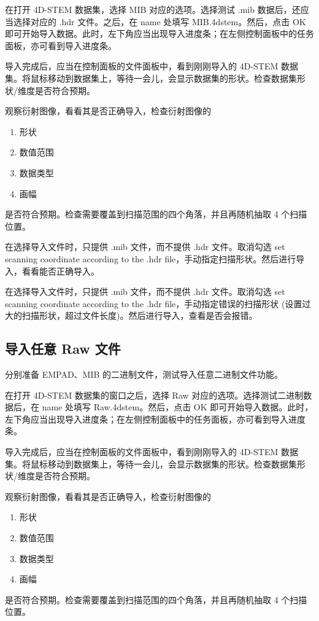 \documentclass[a4paper,12pt]{report}	%
\begin{document}
在打开 4D-STEM 数据集，选择 MIB 对应的选项。选择测试 .mib 数据后，还应当选择对应的 .hdr 文件。之后，在 name 处填写 MIB.4dstem。然后，点击 OK 即可开始导入数据。此时，左下角应当出现导入进度条；在左侧控制面板中的任务面板，亦可看到导入进度条。

导入完成后，应当在控制面板的文件面板中，看到刚刚导入的 4D-STEM 数据集。将鼠标移动到数据集上，等待一会儿，会显示数据集的形状。检查数据集形状/维度是否符合预期。

观察衍射图像，看看其是否正确导入，检查衍射图像的
\begin{enumerate}
    \item 形状 
    \item 数值范围
    \item 数据类型 
    \item 画幅
\end{enumerate} 
是否符合预期。检查需要覆盖到扫描范围的四个角落，并且再随机抽取 4 个扫描位置。

在选择导入文件时，只提供 .mib 文件，而不提供 .hdr 文件。取消勾选 set scanning coordinate according to the .hdr file，手动指定扫描形状。然后进行导入，看看能否正确导入。

在选择导入文件时，只提供 .mib 文件，而不提供 .hdr 文件。取消勾选 set scanning coordinate according to the .hdr file，手动指定错误的扫描形状 (设置过大的扫描形状，超过文件长度)。然后进行导入，查看是否会报错。

\subsection{导入任意 Raw 文件}

分别准备 EMPAD、MIB 的二进制文件，测试导入任意二进制文件功能。

在打开 4D-STEM 数据集的窗口之后，选择 Raw 对应的选项。选择测试二进制数据后，在 name 处填写 Raw.4dstem。然后，点击 OK 即可开始导入数据。此时，左下角应当出现导入进度条；在左侧控制面板中的任务面板，亦可看到导入进度条。

导入完成后，应当在控制面板的文件面板中，看到刚刚导入的 4D-STEM 数据集。将鼠标移动到数据集上，等待一会儿，会显示数据集的形状。检查数据集形状/维度是否符合预期。

观察衍射图像，看看其是否正确导入，检查衍射图像的
\begin{enumerate}
    \item 形状 
    \item 数值范围
    \item 数据类型 
    \item 画幅
\end{enumerate} 
是否符合预期。检查需要覆盖到扫描范围的四个角落，并且再随机抽取 4 个扫描位置。
\end{document}
